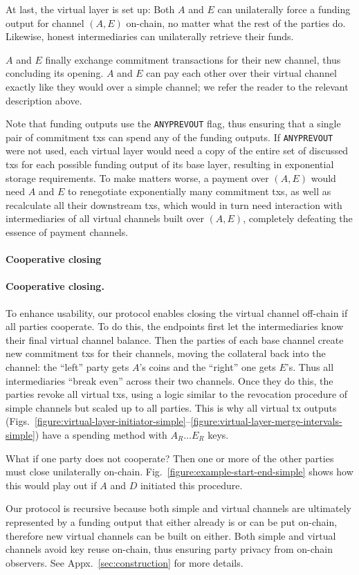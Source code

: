   At last, the virtual layer is set up: Both $A$ and $E$ can unilaterally
  force a funding output for channel $(A, E)$ on-chain, no matter what the rest
  of the parties do. Likewise, honest intermediaries can
  unilaterally retrieve their funds.

  $A$ and $E$ finally exchange
  commitment transactions for their new channel, thus concluding its opening.
  $A$ and $E$ can pay each other over their virtual channel exactly like
  they would over a simple channel; we refer the reader to the relevant
  description above.

  Note that funding outputs use the \texttt{ANYPREVOUT} flag, thus ensuring
  that a single pair of commitment txs can spend any of the funding outputs. If
  \texttt{ANYPREVOUT} were not used, each virtual layer would need a copy of the
  entire set of discussed txs for each possible funding output of its base
  layer, resulting in exponential storage requirements. To make matters worse,
  a payment over $(A, E)$ would need $A$ and $E$ to renegotiate exponentially
  many commitment txs, as well as recalculate all their downstream txs, which
  would in turn need interaction with intermediaries of all virtual channels
  built over $(A, E)$, completely defeating the essence of payment channels.

  \makeatletter%
    {\paragraph{Cooperative closing}}%
    {\paragraph{Cooperative closing.}}%
  \makeatother%
  To enhance usability, our protocol enables closing the virtual channel
  off-chain if all parties cooperate. To do this, the endpoints first
  let the intermediaries know their final virtual channel balance. Then the
  parties of each base channel create new commitment txs for their channels,
  moving the collateral back into the channel: the ``left'' party gets $A$'s
  coins and the ``right'' one gets $E$'s. Thus all intermediaries ``break even''
  across their two channels. Once they do this, the parties revoke all virtual
  txs, using a logic similar to the revocation procedure of simple channels but
  scaled up to all parties. This is why all virtual tx outputs
  (Figs.~\ref{figure:virtual-layer-initiator-simple}--\ref{figure:virtual-layer-merge-intervals-simple})
  have a spending method with $A_R \dots E_R$ keys.

  What if one party does not cooperate? Then one or more of the other parties must close
  unilaterally on-chain. Fig.~\ref{figure:example-start-end-simple} shows how
  this would play out if $A$ and $D$ initiated this procedure.

  Our protocol is recursive because both simple and virtual channels are
  ultimately represented by a funding output that either already is or can be put
  on-chain, therefore new virtual channels can be built on either.
  Both simple and virtual channels avoid key reuse on-chain, thus ensuring party
  privacy from on-chain observers. See Appx.~\ref{sec:construction} for more
  details.
